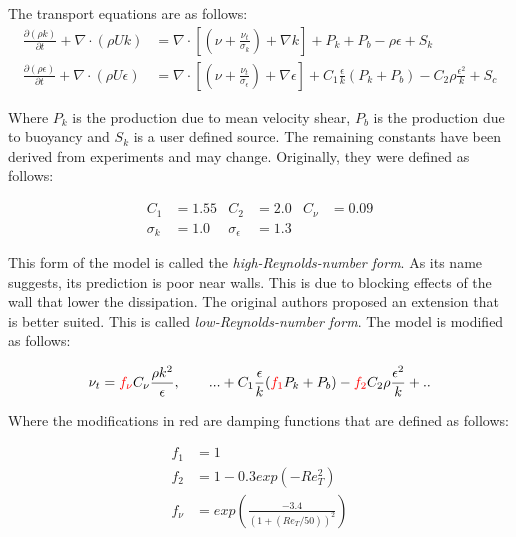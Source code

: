 \noindent The transport equations are as follows:
\begin{align}
    \frac{\partial (\rho k)}{\partial t} + 
    \nabla \cdot (\rho U k) &=
    \nabla \cdot \left[ 
        \left( \nu + \frac{\nu_t}{\sigma_k}\right) + \nabla k 
    \right] + P_k + P_b - \rho \epsilon + S_k \\
%
    \frac{\partial (\rho \epsilon)}{\partial t} + 
    \nabla \cdot (\rho U \epsilon) &=
    \nabla \cdot \left[ 
        \left( \nu + \frac{\nu_t}{\sigma_{\epsilon}}\right) + \nabla  \epsilon
    \right] + C_1 \frac{\epsilon}{k}(P_k + P_b) - 
    C_2 \rho \frac{\epsilon^2}{k} + S_c
\end{align}

\noindent Where $P_k$ is the production due to mean velocity shear, $P_b$ is
the production due to buoyancy and $S_k$ is a user defined source. The
remaining constants have been derived from experiments and may change.
Originally, they were defined as follows:

\begin{align*}
    C_1 &= 1.55         & C_2               &= 2.0  & C_{\nu} &= 0.09\\
    \sigma_k &= 1.0     & \sigma_{\epsilon} &= 1.3
\end{align*}

\noindent This form of the model is called the \textit{high-Reynolds-number
form}. As its name suggests, its prediction is poor near walls. This is due to
blocking effects of the wall that lower the dissipation. The original authors
proposed an extension that is better suited. This is called
\textit{low-Reynolds-number form}. The model is modified as follows:

\begin{align}
    \nu_t = \textcolor{red}{f_{\nu}} C_{\nu} \frac{\rho k^2}{\epsilon},  \qquad
%
    ... + C_1 \frac{\epsilon}{k}(\textcolor{red}{f_1} P_k + P_b) 
    - \textcolor{red}{f_2} C_2 \rho \frac{\epsilon^2}{k} + ..
\end{align}

\noindent Where the modifications in red are damping functions that are defined
as follows:

\begin{align}
    f_1 &= 1 \\
    f_2 &= 1 - 0.3 exp(-Re_T^2) \\
    f_{\nu} &= exp \left( \frac{-3.4}{(1 + (Re_T/50))^2}\right) \\
\end{align}

